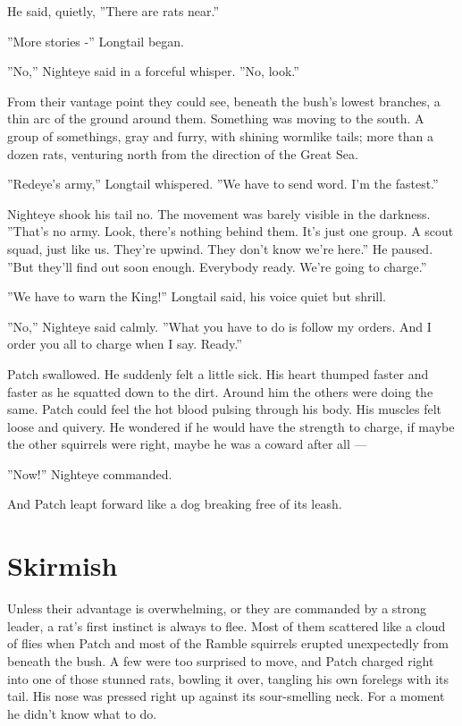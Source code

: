 \documentclass[12pt]{book}
\begin{document}
He said, quietly, ''There are rats near.''

''More stories -'' Longtail began.

''No,'' Nighteye said in a forceful whisper. ''No, look.''

From their vantage point they could see, beneath the bush's lowest branches, a thin arc of the ground around them. Something was moving to the south. A group of somethings, gray and furry, with shining wormlike tails; more than a dozen rats, venturing north from the direction of the Great Sea.

''Redeye's army,'' Longtail whispered. ''We have to send word. I'm the fastest.''

Nighteye shook his tail no. The movement was barely visible in the darkness. ''That's no army. Look, there's nothing behind them. It's just one group. A scout squad, just like us. They're upwind. They don't know we're here.'' He paused. ''But they'll find out soon enough. Everybody ready. We're going to charge.''

''We have to warn the King!'' Longtail said, his voice quiet but shrill.

''No,'' Nighteye said calmly. ''What you have to do is follow my orders. And I order you all to charge when I say. Ready.''

Patch swallowed. He suddenly felt a little sick. His heart thumped faster and faster as he squatted down to the dirt. Around him the others were doing the same. Patch could feel the hot blood pulsing through his body. His muscles felt loose and quivery. He wondered if he would have the strength to charge, if maybe the other squirrels were right, maybe he was a coward after all ---

''Now!'' Nighteye commanded.

And Patch leapt forward like a dog breaking free of its leash.


\section{Skirmish}

Unless their advantage is overwhelming, or they are commanded by a strong leader, a rat's first instinct is always to flee. Most of them scattered like a cloud of flies when Patch and most of the Ramble squirrels erupted unexpectedly from beneath the bush. A few were too surprised to move, and Patch charged right into one of those stunned rats, bowling it over, tangling his own forelegs with its tail. His nose was pressed right up against its sour-smelling neck. For a moment he didn't know what to do.
\end{document}
